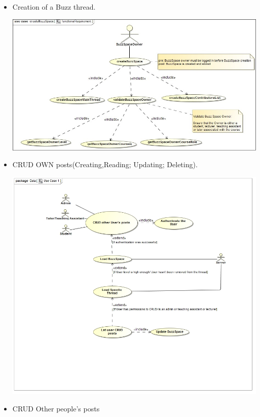\documentclass[a4paper,12pt]{report}
\begin{document}
\begin{itemize}
\begin{center}
	\end{center}	
  \item Creation of a Buzz thread.
  	\begin{center}
  	\includegraphics[width=1\textwidth]{../Functional_Requirements_DIagrams/UseCases/use_case_createBuzzSpace.jpg}\\[0.4cm]    
	\end{center}	
    \item CRUD OWN posts(Creating,Reading; Updating; Deleting).
	\begin{center}
  	\includegraphics[width=1\textwidth]{../Functional_Requirements_Diagrams/UseCases1,2,3 - Kale-ab Tessera/UseCase1.jpg}\\[0.4cm]    
	\end{center}
\item CRUD Other people's posts 

\end{itemize}
\end{document}
